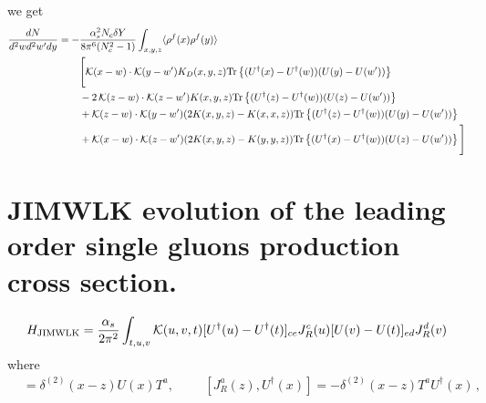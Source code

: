 \documentclass[10pt]{article}
\numberwithin{equation}{section}
\begin{document}
we get 
\begin{align}
\label{Eq:LOBFKL}
    \frac{dN}{d^2 w d^2 w' dy}= - &\frac{\alpha_{s}^2 N_c  \delta Y }{8\pi^{6} (N_c^2-1)}
    \int_{x,y,z} \langle \rho^f(x) \rho^f(y)\rangle 
    \notag \\ &
    \Bigg[
    {\cal K} (x-w) \cdot {\cal K} (y-w') K_D(x,y,z) {\rm Tr} \left \{  (U^\dagger(x)-U^\dagger(w)) (U(y)-U(w')) \right\}
    \notag \\ &
    -2\, {\cal K} (z-w) \cdot {\cal K} (z-w') K(x,y,z) {\rm Tr} \left \{  (U^\dagger(z)-U^\dagger(w)) (U(z)-U(w')) \right\}
    \notag \\ &
    +
    {\cal K} (z-w) \cdot {\cal K} (y-w') (2K(x,y,z) - K(x,x,z)) {\rm Tr} \left \{  (U^\dagger(z)-U^\dagger(w)) (U(y)-U(w')) \right\}
    \notag \\ &
    +
    {\cal K} (x-w) \cdot {\cal K} (z-w') (2K(x,y,z) - K(y,y,z)) {\rm Tr} \left \{  (U^\dagger(x)-U^\dagger(w)) (U(z)-U(w')) \right\}
    \Bigg]
\end{align}





\section{JIMWLK evolution of the leading order single gluons production cross section.}


\begin{equation}
\label{Eq:HLO}
H_{\text{JIMWLK}}= \frac{\alpha_s}{2 \pi^2} \int_{t,u,v} 
{\cal K}(u, v, t)
[U^\dagger(u)  - U^\dagger(t)]_{ce} J_R ^c(u)    [U(v)  - U(t)  ]_{ed} J_R ^d(v)
\end{equation}
where 
 \begin{align}
    [J_{R}^a (z), U(x)] &= \delta^{(2)}(x-z) U(x)T^a,  \hspace{1cm}    [J_{R}^a (z) ,U^\dagger(x)] =- \delta^{(2)}(x-z) T^a U^\dagger(x)\,,
\end{align}
\end{document}
